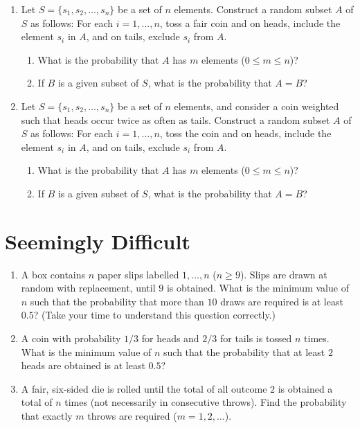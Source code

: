 \documentclass[svgnames]{amsart}
\begin{document}
\begin{enumerate}
\item Let $S = \{s_1, s_2, \ldots, s_n\}$ be a set of $n$ elements. Construct a random subset $A$ of $S$ as follows: For each $i = 1, \ldots, n$, toss a fair coin and on heads, include the element $s_i$ in $A$, and on tails, exclude $s_i$ from $A$.
\begin{enumerate}
	\item What is the probability that $A$ has $m$ elements ($0 \le m \le n$)?
	\item If $B$ is a given subset of $S$, what is the probability that $A = B$?
\end{enumerate}

\item Let $S = \{s_1, s_2, \ldots, s_n\}$ be a set of $n$ elements, and consider a coin weighted such that heads occur twice as often as tails. Construct a random subset $A$ of $S$ as follows: For each $i = 1, \ldots, n$, toss the coin and on heads, include the element $s_i$ in $A$, and on tails, exclude $s_i$ from $A$.
\begin{enumerate}
	\item What is the probability that $A$ has $m$ elements ($0 \le m \le n$)?
	\item If $B$ is a given subset of $S$, what is the probability that $A = B$?
\end{enumerate}

\end{enumerate} %

\section{Seemingly Difficult}
\begin{enumerate}
\item A box contains $n$ paper slips labelled $1, \ldots, n$ ($n \ge 9$). Slips are drawn at random with replacement, until $9$ is obtained. What is the minimum value of $n$ such that the probability that more than $10$ draws are required is at least $0.5$? {\scriptsize (Take your time to understand this question correctly.)}

\item A coin with probability $1/3$ for heads and $2/3$ for tails is tossed $n$ times. What is the minimum value of $n$ such that the probability that at least $2$ heads are obtained is at least $0.5$?

\item A fair, six-sided die is rolled until the total of all outcome $2$ is obtained a total of $n$ times (not necessarily in consecutive throws). Find the probability that exactly $m$ throws are required ($m = 1, 2, \ldots$).
\end{enumerate} %
\end{document}
